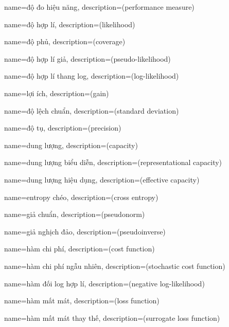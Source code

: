 {
    name={độ đo hiệu năng},
    description={(performance measure)}
}

{
    name={độ hợp lí},
    description={(likelihood)}
}

{
    name={độ phủ},
    description={(coverage)}
}

{
    name={độ hợp lí giả},
    description={(pseudo-likelihood)}
}

{
    name={độ hợp lí thang log},
    description={(log-likelihood)}
}

{
    name={lợi ích},
    description={(gain)}
}

{
    name={độ lệch chuẩn},
    description={(standard deviation)}
}


{
    name={độ tụ},
    description={(precision)}
}

{
    name={dung lượng},
    description={(capacity)}
}

{
    name={dung lượng biểu diễn},
    description={(representational capacity)}
}

{
    name={dung lượng hiệu dụng},
    description={(effective capacity)}
}

{
    name={entropy chéo},
    description={(cross entropy)}
}

{
    name={giả chuẩn},
    description={(pseudonorm)}
}

{
    name={giả nghịch đảo},
    description={(pseudoinverse)}
}

{
    name={hàm chi phí},
    description={(cost function)}
}

{
    name={hàm chi phí ngẫu nhiên},
    description={(stochastic cost function)}
}

{
    name={hàm đối log hợp lí},
    description={(negative log-likelihood)}
}

{
    name={hàm mất mát},
    description={(loss function)}
}

{
    name={hàm mất mát thay thế},
    description={(surrogate loss function)}
}

